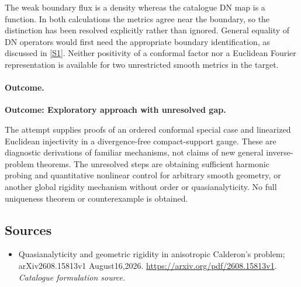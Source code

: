 \documentclass[11pt,a4paper]{article}
\newcommand{\sref}[2]{\hyperlink{source:#1:#2}{[S#2]}}
\numberwithin{equation}{section}
\begin{document}
The weak boundary flux is a density whereas the catalogue DN map is a
function. In both calculations the metrics agree near the boundary, so
the distinction has been resolved explicitly rather than ignored. General
equality of DN operators would first need the appropriate boundary
identification, as discussed in \sref{statement}{1}. Neither positivity of a
conformal factor nor a Euclidean Fourier representation is available for
two unrestricted smooth metrics in the target.

\paragraph{Outcome.}
\textbf{Outcome: Exploratory approach with unresolved gap.}

The attempt supplies proofs of an ordered conformal special case and
linearized Euclidean injectivity in a divergence-free compact-support
gauge. These are diagnostic derivations of familiar mechanisms, not claims
of new general inverse-problem theorems. The unresolved steps are obtaining
sufficient harmonic probing and quantitative nonlinear control for arbitrary
smooth geometry, or another global rigidity mechanism without order or
quasianalyticity. No full uniqueness theorem or counterexample is obtained.
\subsection{Sources}
\begin{itemize}\raggedright
\item[\textnormal{[S1]}]\hypertarget{source:statement:1}{} Quasianalyticity and geometric rigidity in anisotropic Calderon's problem; arXiv2608.15813v1 August16,2026.
\url{https://arxiv.org/pdf/2608.15813v1}.
{\small\textit{Catalogue formulation source.}}
\end{itemize}
\end{document}
